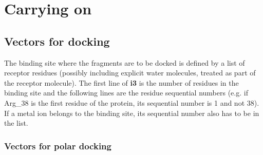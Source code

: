 \documentclass[a4paper,12pt,titlepage]{article}
\begin{document}




\newpage

\section{Carrying on}

\subsection{Vectors for docking}
\label{ssec:VecDock}

The binding site where the fragments are to be docked is defined by a list of receptor 
residues (possibly including explicit water molecules, treated as part of the receptor 
molecule).
The first line of {\bf i3} is the number of residues in the binding site and the following lines are 
the residue sequential numbers (e.g. if Arg\_38 is the first residue of the protein, its sequential 
number is 1 and not 38). If a metal ion belongs to the binding site, its sequential number also has to be 
in the list.

\subsubsection{Vectors for polar docking}
\end{document}
